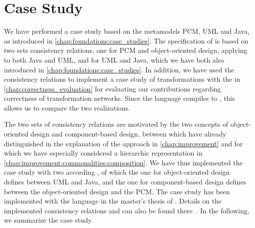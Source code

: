 \section{Case Study}

We have performed a case study based on the metamodels \gls{PCM}, \gls{UML} and Java, as introduced in \autoref{chap:foundations:case_studies}.
The specification of \commonalities is based on two sets consistency relations, one for \gls{PCM} and object-oriented design, applying to both Java and \gls{UML}, and for \gls{UML} and Java, which we have both also introduced in \autoref{chap:foundations:case_studies}.
In addition, we have used the consistency relations to implement a case study of transformations with the \reactionslanguage in \autoref{chap:correctness_evaluation} for evaluating our contributions regarding correctness of transformation networks.
Since the \commonalities language compiles to \reactions, this allows us to compare the two realizations.

The two sets of consistency relations are motivated by the two concepts of object-oriented design and component-based design, between which have already distinguished in the explanation of the \commonalities approach in \autoref{chap:improvement} and for which we have especially considered a hierarchic representation in \autoref{chap:improvement:commonalities:composition}.
We have thus implemented the case study with two according \conceptmetamodels, of which the one for object-oriented design defines \commonalities between \gls{UML} and Java, and the one for component-based design defines \commonalities between the object-oriented design \conceptmetamodel and the \gls{PCM}.
The case study has been implemented with the \commonalities language in the master's thesis of .
Details on the implemented consistency relations and \commonalities can also be found there~.
In the following, we summarize the case study.



